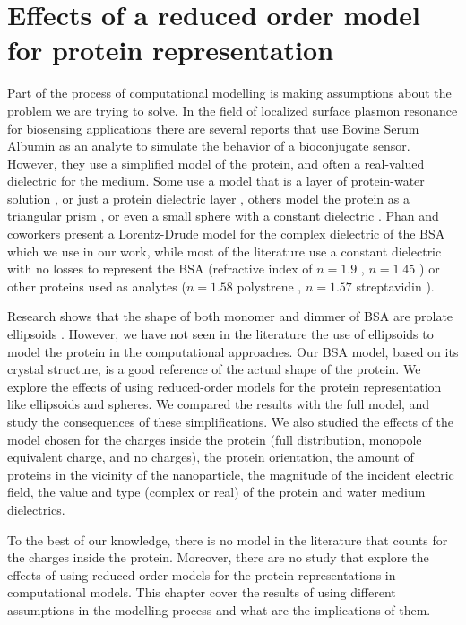 \chapter{Effects of a reduced order model for protein representation}
\graphicspath{{rom_studies/figs/}}

Part of the process of computational modelling is making assumptions about the problem we are trying to solve. In the 
field of localized surface plasmon resonance for biosensing applications there are several reports that use Bovine Serum Albumin 
as an analyte to simulate the behavior of a bioconjugate sensor. However, they use a simplified model
of the protein, and often a real-valued dielectric for the medium. Some use a model that is 
a layer of protein-water solution \cite{PhanETal2013}, 
or just a protein dielectric layer \cite{NghiemETal2012}, others model the
protein as a triangular prism \cite{DanHu2014}, or even a small sphere with a 
constant dielectric \cite{SantiagoCordobaETal2011, UngerETal2009}. Phan and 
coworkers \cite{PhanETal2013} present a Lorentz-Drude model for the complex 
dielectric of the BSA which we use in our work, while most of the literature 
use a constant dielectric with no losses to represent the BSA 
(refractive index of $n= 1.9$ \cite{NghiemETal2012}, $n= 1.45$ \cite{SantiagoCordobaETal2011}) or
other proteins used as analytes ($n=1.58$ polystrene \cite{UngerETal2009}, $n=1.57$ 
streptavidin \cite{ShenETal2013}). 

Research shows that the shape of both monomer and dimmer of BSA are prolate ellipsoids 
\cite{MoserETal1966, SquireETal1968, WrightETal1975}. However, we have not seen in the literature the use of ellipsoids 
to model the protein in the computational approaches. Our BSA model, based on its crystal 
structure, is a good reference of the actual shape of the protein. We 
explore the effects of using reduced-order models for the protein representation like ellipsoids and spheres. We compared 
the results with the full model, and study the consequences of these simplifications. We also studied the effects of the model chosen 
for the charges inside the protein (full distribution, monopole equivalent charge, and no charges), the protein orientation, the 
amount of proteins in the vicinity of the nanoparticle, the magnitude of the incident electric field, the value and type (complex or real)
of the protein and water medium dielectrics. 

To the best of our knowledge, there is no model in the literature that counts for the charges inside the protein. 
Moreover, there are no study that explore the effects of using reduced-order models for the protein representations 
in computational models. This chapter cover the results of using different assumptions in the modelling process and what 
are the implications of them.

